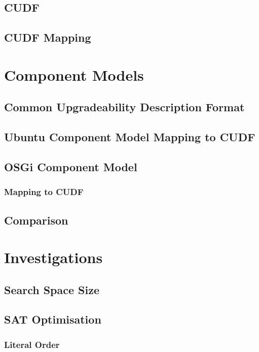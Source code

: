 \documentclass{report}
\begin{document}
\section{CUDF}

\section{CUDF Mapping}



\chapter{Component Models}

\section{Common Upgradeability Description Format}

\section{Ubuntu Component Model Mapping to CUDF}

\section{OSGi Component Model}
\subsection{Mapping to CUDF}

\section{Comparison}

\chapter{Investigations}

\section{Search Space Size}

\section{SAT Optimisation}
\subsection{Literal Order}
\end{document}
